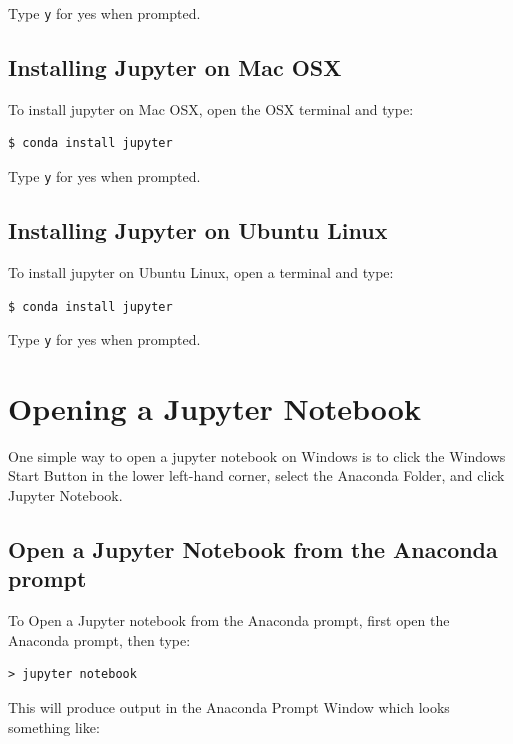 \documentclass{book}
\begin{document}
Type \lstinline!y! for yes when prompted.

    \subsection{Installing Jupyter on Mac
OSX}\label{installing-jupyter-on-mac-osx}

To install jupyter on Mac OSX, open the OSX terminal and type:

\begin{lstlisting}
$ conda install jupyter
\end{lstlisting}

Type \lstinline!y! for yes when prompted.

    \subsection{Installing Jupyter on Ubuntu
Linux}\label{installing-jupyter-on-ubuntu-linux}

To install jupyter on Ubuntu Linux, open a terminal and type:

\begin{lstlisting}
$ conda install jupyter
\end{lstlisting}

Type \lstinline!y! for yes when prompted.

    \section{Opening a Jupyter Notebook}\label{opening-a-jupyter-notebook}

    One simple way to open a jupyter notebook on Windows is to click the
Windows Start Button in the lower left-hand corner, select the Anaconda
Folder, and click Jupyter Notebook.

    \subsection{Open a Jupyter Notebook from the Anaconda
prompt}\label{open-a-jupyter-notebook-from-the-anaconda-prompt}

    To Open a Jupyter notebook from the Anaconda prompt, first open the
Anaconda prompt, then type:

\begin{lstlisting}
> jupyter notebook
\end{lstlisting}

This will produce output in the Anaconda Prompt Window which looks
something like:
\end{document}
